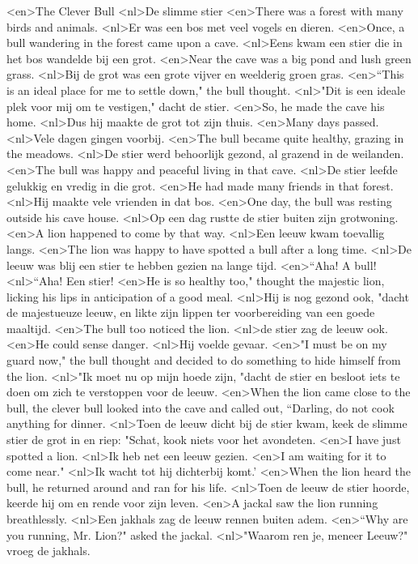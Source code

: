 <en>The Clever Bull
<nl>De slimme stier
<en>There was a forest with many birds and animals.
<nl>Er was een bos met veel vogels en dieren.
<en>Once, a bull wandering in the forest came upon a cave.
<nl>Eens kwam een stier die in het bos wandelde bij een grot.
<en>Near the cave was a big pond and lush green grass.
<nl>Bij de grot was een grote vijver en weelderig groen gras.
<en>“This is an ideal place for me to settle down," the bull thought.
<nl>"Dit is een ideale plek voor mij om te vestigen," dacht de stier.
<en>So, he made the cave his home.
<nl>Dus hij maakte de grot tot zijn thuis.
<en>Many days passed.
<nl>Vele dagen gingen voorbij.
<en>The bull became quite healthy, grazing in the meadows.
<nl>De stier werd behoorlijk gezond, al grazend in de weilanden.
<en>The bull was happy and peaceful living in that cave.
<nl>De stier leefde gelukkig en vredig in die grot.
<en>He had made many friends in that forest.
<nl>Hij maakte vele vrienden in dat bos.
<en>One day, the bull was resting outside his cave house.
<nl>Op een dag rustte de stier buiten zijn grotwoning.
<en>A lion happened to come by that way.
<nl>Een leeuw kwam toevallig langs.
<en>The lion was happy to have spotted a bull after a long time.
<nl>De leeuw was blij een stier te hebben gezien na lange tijd.
<en>“Aha! A bull!
<nl>“Aha! Een stier!
<en>He is so healthy too," thought the majestic lion, licking his lips in anticipation of a good meal.
<nl>Hij is nog  gezond ook, "dacht de majestueuze leeuw, en likte zijn lippen ter voorbereiding van een goede maaltijd.
<en>The bull too noticed the lion.
<nl>de stier zag de leeuw ook.
<en>He could sense danger.
<nl>Hij voelde gevaar.
<en>"I must be on my guard now," the bull thought and decided to do something to hide himself from the lion.
<nl>"Ik moet nu op mijn hoede zijn, "dacht de stier en besloot iets te doen om zich te verstoppen voor de leeuw.
<en>When the lion came close to the bull, the clever bull looked into the cave and called out, “Darling, do not cook anything for dinner.
<nl>Toen de leeuw dicht bij de stier kwam, keek de slimme stier de grot in en riep: "Schat, kook niets voor het avondeten.
<en>I have just spotted a lion.
<nl>Ik heb net een leeuw gezien.
<en>I am waiting for it to come near."
<nl>Ik wacht tot hij dichterbij komt.'
<en>When the lion heard the bull, he returned around and ran for his life.
<nl>Toen de leeuw de stier hoorde, keerde hij om en rende voor zijn leven.
<en>A jackal saw the lion running breathlessly.
<nl>Een jakhals zag de leeuw rennen buiten adem.
<en>“Why are you running, Mr. Lion?" asked the jackal.
<nl>"Waarom ren je, meneer Leeuw?" vroeg de jakhals.
